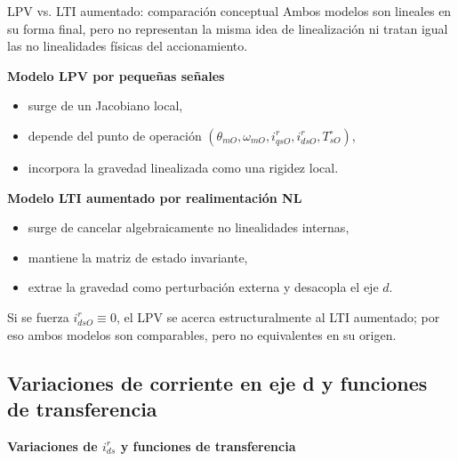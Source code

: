 \documentclass[aspectratio=169,t]{beamer}
\newcommand{\sectionslide}[1]{%
  \begin{frame}[plain]
    \vfill
    \centering
    {\Huge\bfseries\color{uncBlue} #1\par}
    \vfill
  \end{frame}
}
\begin{document}
\begin{frame}{LPV vs. LTI aumentado: comparación conceptual}
{\small\color{uncGray}Ambos modelos son lineales en su forma final, pero no representan la misma idea de linealización ni tratan igual las no linealidades físicas del accionamiento.}\par
\vspace{3mm}

\textbf{Modelo LPV por pequeñas señales}
\begin{itemize}
  \item surge de un Jacobiano local,
  \item depende del punto de operación $(\theta_{mO},\omega_{mO},i_{qsO}^{r},i_{dsO}^{r},T_{sO}^\circ)$,
  \item incorpora la gravedad linealizada como una rigidez local.
\end{itemize}

\textbf{Modelo LTI aumentado por realimentación NL}
\begin{itemize}
  \item surge de cancelar algebraicamente no linealidades internas,
  \item mantiene la matriz de estado invariante,
  \item extrae la gravedad como perturbación externa y desacopla el eje $d$.
\end{itemize}

{\small Si se fuerza $i_{dsO}^{r}\equiv 0$, el LPV se acerca estructuralmente al LTI aumentado; por eso ambos modelos son comparables, pero no equivalentes en su origen.}
\end{frame}

\subsection{Variaciones de corriente en eje d y funciones de transferencia}
\sectionslide{Variaciones de $i_{ds}^{r}$ y funciones de transferencia}
\end{document}

